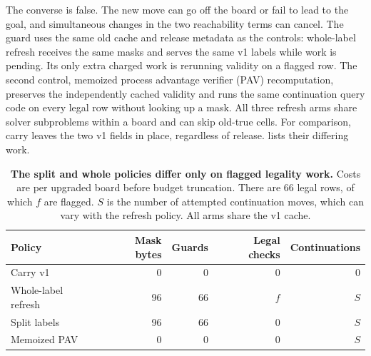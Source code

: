 The converse is false. The new move can go off the board or fail to lead
to the goal, and simultaneous changes in the two reachability terms can
cancel. The guard uses the same old cache and release metadata as the controls:
whole-label refresh receives the same masks and serves the same v1
labels while work is pending. Its only extra charged work is rerunning
validity on a flagged row. The second control, memoized process advantage
verifier (PAV) recomputation,
preserves the independently cached validity and runs the same continuation
query code on every legal row without looking up a mask. All three refresh
arms share solver subproblems within a board and can skip old-true cells.
For comparison, carry leaves the two v1 fields in place, regardless of
release.  lists their differing work.

\begin{table}[h]
\centering
\caption{\textbf{The split and whole policies differ only on flagged legality work.}
Costs are per upgraded board before budget truncation. There are 66 legal
rows, of which $f$ are flagged. $S$ is the number of attempted
continuation moves, which can vary with the refresh policy. All arms
share the v1 cache.}
\label{tab:axes}
\begin{tabular}{lrrrr}
\toprule
Policy & Mask bytes & Guards & Legal checks & Continuations \\
\midrule
Carry v1 & 0 & 0 & 0 & 0 \\
Whole-label refresh & 96 & 66 & $f$ & $S$ \\
Split labels & 96 & 66 & 0 & $S$ \\
Memoized PAV & 0 & 0 & 0 & $S$ \\
\bottomrule
\end{tabular}
\end{table}

